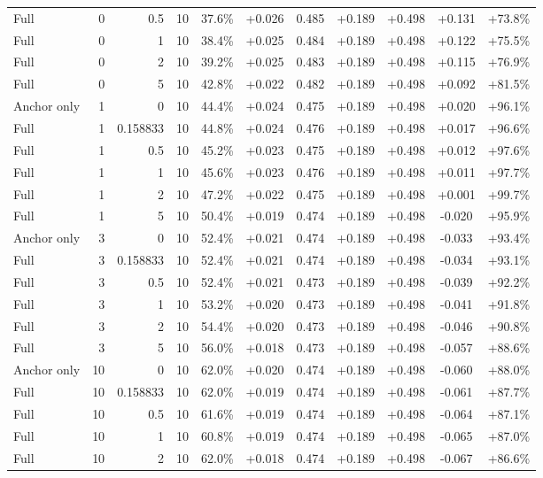 \begin{table}[htbp]
\begin{tabular}{lrrrccccccc}
Full & 0 & 0.5 & 10 & 37.6\% & +0.026 & 0.485 & +0.189 & +0.498 & +0.131 & +73.8\% \\
Full & 0 & 1 & 10 & 38.4\% & +0.025 & 0.484 & +0.189 & +0.498 & +0.122 & +75.5\% \\
Full & 0 & 2 & 10 & 39.2\% & +0.025 & 0.483 & +0.189 & +0.498 & +0.115 & +76.9\% \\
Full & 0 & 5 & 10 & 42.8\% & +0.022 & 0.482 & +0.189 & +0.498 & +0.092 & +81.5\% \\
Anchor only & 1 & 0 & 10 & 44.4\% & +0.024 & 0.475 & +0.189 & +0.498 & +0.020 & +96.1\% \\
Full & 1 & 0.158833 & 10 & 44.8\% & +0.024 & 0.476 & +0.189 & +0.498 & +0.017 & +96.6\% \\
Full & 1 & 0.5 & 10 & 45.2\% & +0.023 & 0.475 & +0.189 & +0.498 & +0.012 & +97.6\% \\
Full & 1 & 1 & 10 & 45.6\% & +0.023 & 0.476 & +0.189 & +0.498 & +0.011 & +97.7\% \\
Full & 1 & 2 & 10 & 47.2\% & +0.022 & 0.475 & +0.189 & +0.498 & +0.001 & +99.7\% \\
Full & 1 & 5 & 10 & 50.4\% & +0.019 & 0.474 & +0.189 & +0.498 & -0.020 & +95.9\% \\
Anchor only & 3 & 0 & 10 & 52.4\% & +0.021 & 0.474 & +0.189 & +0.498 & -0.033 & +93.4\% \\
Full & 3 & 0.158833 & 10 & 52.4\% & +0.021 & 0.474 & +0.189 & +0.498 & -0.034 & +93.1\% \\
Full & 3 & 0.5 & 10 & 52.4\% & +0.021 & 0.473 & +0.189 & +0.498 & -0.039 & +92.2\% \\
Full & 3 & 1 & 10 & 53.2\% & +0.020 & 0.473 & +0.189 & +0.498 & -0.041 & +91.8\% \\
Full & 3 & 2 & 10 & 54.4\% & +0.020 & 0.473 & +0.189 & +0.498 & -0.046 & +90.8\% \\
Full & 3 & 5 & 10 & 56.0\% & +0.018 & 0.473 & +0.189 & +0.498 & -0.057 & +88.6\% \\
Anchor only & 10 & 0 & 10 & 62.0\% & +0.020 & 0.474 & +0.189 & +0.498 & -0.060 & +88.0\% \\
Full & 10 & 0.158833 & 10 & 62.0\% & +0.019 & 0.474 & +0.189 & +0.498 & -0.061 & +87.7\% \\
Full & 10 & 0.5 & 10 & 61.6\% & +0.019 & 0.474 & +0.189 & +0.498 & -0.064 & +87.1\% \\
Full & 10 & 1 & 10 & 60.8\% & +0.019 & 0.474 & +0.189 & +0.498 & -0.065 & +87.0\% \\
Full & 10 & 2 & 10 & 62.0\% & +0.018 & 0.474 & +0.189 & +0.498 & -0.067 & +86.6\% \\

\end{tabular}
\end{table}
